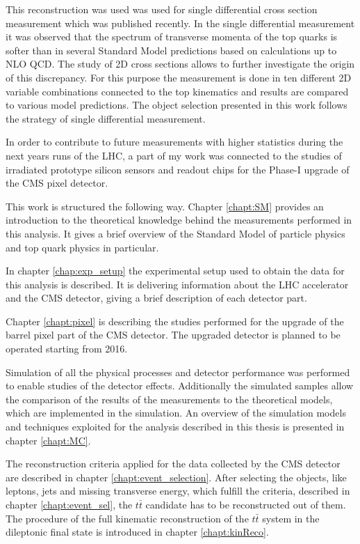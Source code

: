 This reconstruction was used was used for single differential cross section measurement \cite{Khachatryan:2015oqac} which was 
published recently. In the single differential measurement it was observed that the spectrum of transverse momenta of the 
top quarks is softer than in several Standard Model predictions based on calculations up to NLO QCD. The study of 2D cross 
sections allows to further investigate the origin of this discrepancy. For this purpose the measurement is done in ten 
different 2D variable combinations connected to the top kinematics and results are compared to various model predictions.
The object selection presented in this work follows the strategy of single differential measurement.

In order to contribute to future measurements with higher statistics during
the next years runs of the LHC, a part of my work was connected to the studies of irradiated
prototype silicon sensors and readout chips for the Phase-I upgrade of the CMS pixel detector.

This work is structured the following way. Chapter \ref{chapt:SM} provides an introduction to the theoretical
knowledge behind the measurements performed in this analysis. It gives a brief overview of the Standard
Model of particle physics and top quark physics in particular.

In chapter \ref{chap:exp_setup} the experimental setup used to obtain the data for this analysis is described.
It is delivering information about the LHC accelerator and the CMS detector, giving a brief description of each detector part.

Chapter \ref{chapt:pixel} is describing the studies performed for the
upgrade of the barrel pixel part of the CMS detector. The upgraded detector is planned to be operated starting from 2016.

Simulation of all the physical processes and detector performance was performed to enable studies of the detector effects.
Additionally the simulated samples allow the comparison of the results of the measurements to the theoretical models, 
which are implemented in the simulation. An overview of the simulation
models and techniques exploited for the analysis described in this thesis is presented in chapter \ref{chapt:MC}.

The reconstruction criteria applied for the data collected by the CMS detector are described
in chapter \ref{chapt:event_selection}. After selecting the objects, like leptons, jets and missing transverse energy, which 
fulfill the criteria, described in chapter \ref{chapt:event_sel}, the $t\bar{t}$ candidate has to be reconstructed out
of them. The procedure of the full kinematic reconstruction of the $t\bar{t}$ system in the dileptonic final state is introduced
in chapter \ref{chapt:kinReco}.

